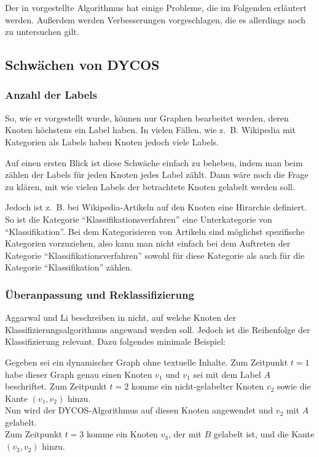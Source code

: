 Der in \cite{aggarwal2011} vorgestellte Algorithmus hat einige Probleme,
die im Folgenden erläutert werden. Außerdem werden Verbesserungen
vorgeschlagen, die es allerdings noch zu untersuchen gilt.

\subsection{Schwächen von DYCOS}
\subsubsection{Anzahl der Labels}
So, wie er vorgestellt wurde, können nur Graphen bearbeitet werden, 
deren Knoten höchstens ein Label haben. In vielen Fällen, wie z.~B. 
Wikipedia mit Kategorien als Labels haben Knoten jedoch viele Labels.

Auf einen ersten Blick ist diese Schwäche einfach zu beheben, indem 
man beim zählen der Labels für jeden Knoten jedes Label zählt. Dann
wäre noch die Frage zu klären, mit wie vielen Labels der betrachtete
Knoten gelabelt werden soll.

Jedoch ist z.~B. bei Wikipedia-Artikeln auf den Knoten eine 
Hirarchie definiert. So ist die Kategorie \enquote{Klassifikationsverfahren}
eine Unterkategorie von \enquote{Klassifikation}. Bei dem Kategorisieren
von Artikeln sind möglichst spezifische Kategorien vorzuziehen, also
kann man nicht einfach bei dem Auftreten der Kategorie \enquote{Klassifikationsverfahren}
sowohl für diese Kategorie als auch für die Kategorie \enquote{Klassifikation}
zählen.


\subsubsection{Überanpassung und Reklassifizierung}
Aggarwal und Li beschreiben in \cite{aggarwal2011} nicht, auf welche
Knoten der Klassifizierungsalgorithmus angewand werden soll. Jedoch
ist die Reihenfolge der Klassifizierung relevant. Dazu folgendes 
minimale Beispiel:

Gegeben sei ein dynamischer Graph ohne textuelle Inhalte. Zum Zeitpunkt
$t=1$ habe dieser Graph genau einen Knoten $v_1$ und $v_1$  sei
mit dem Label $A$ beschriftet. Zum Zeitpunkt $t=2$ komme ein nicht-gelabelter
Knoten $v_2$ sowie die Kante $(v_1, v_2)$ hinzu.\\
Nun wird der DYCOS-Algorithmus auf diesen Knoten angewendet und
$v_2$ mit $A$ gelabelt.\\
Zum Zeitpunkt $t=3$ komme ein Knoten $v_3$, der mit $B$ gelabelt ist,
und die Kante $(v_3, v_2)$ hinzu.

